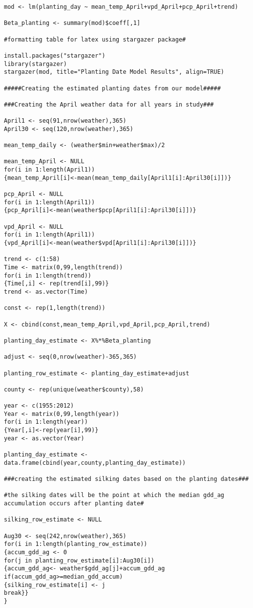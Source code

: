 \begin{lstlisting}
mod <- lm(planting_day ~ mean_temp_April+vpd_April+pcp_April+trend)

Beta_planting <- summary(mod)$coeff[,1]

#formatting table for latex using stargazer package#

install.packages("stargazer")
library(stargazer)
stargazer(mod, title="Planting Date Model Results", align=TRUE)

#####Creating the estimated planting dates from our model#####

###Creating the April weather data for all years in study###

April1 <- seq(91,nrow(weather),365)
April30 <- seq(120,nrow(weather),365)

mean_temp_daily <- (weather$min+weather$max)/2

mean_temp_April <- NULL
for(i in 1:length(April1))
{mean_temp_April[i]<-mean(mean_temp_daily[April1[i]:April30[i]])}

pcp_April <- NULL
for(i in 1:length(April1))
{pcp_April[i]<-mean(weather$pcp[April1[i]:April30[i]])}

vpd_April <- NULL
for(i in 1:length(April1))
{vpd_April[i]<-mean(weather$vpd[April1[i]:April30[i]])}

trend <- c(1:58)
Time <- matrix(0,99,length(trend))
for(i in 1:length(trend))
{Time[,i] <- rep(trend[i],99)}
trend <- as.vector(Time)

const <- rep(1,length(trend))

X <- cbind(const,mean_temp_April,vpd_April,pcp_April,trend)

planting_day_estimate <- X%*%Beta_planting

adjust <- seq(0,nrow(weather)-365,365)

planting_row_estimate <- planting_day_estimate+adjust

county <- rep(unique(weather$county),58)

year <- c(1955:2012)
Year <- matrix(0,99,length(year))
for(i in 1:length(year))
{Year[,i]<-rep(year[i],99)}
year <- as.vector(Year)

planting_day_estimate <- data.frame(cbind(year,county,planting_day_estimate))

###creating the estimated silking dates based on the planting dates###

#the silking dates will be the point at which the median gdd_ag accumulation occurs after planting date#

silking_row_estimate <- NULL

Aug30 <- seq(242,nrow(weather),365)
for(i in 1:length(planting_row_estimate))
{accum_gdd_ag <- 0
for(j in planting_row_estimate[i]:Aug30[i])
{accum_gdd_ag<- weather$gdd_ag[j]+accum_gdd_ag
if(accum_gdd_ag>=median_gdd_accum)
{silking_row_estimate[i] <- j
break}}
}


\end{lstlisting}
